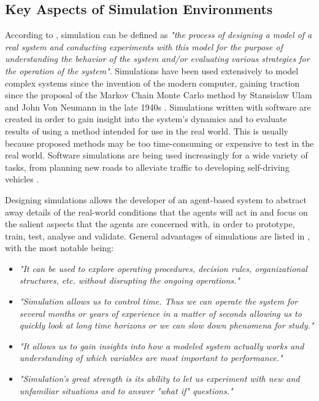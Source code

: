 \subsection{Key Aspects of Simulation Environments}
According to \citeauthor{Shannon1998INTRODUCTIONSIMULATION} \cite{Shannon1998INTRODUCTIONSIMULATION}, simulation can be defined as
\textit{"the process of designing a model of a real system and conducting experiments with this model for the purpose of understanding the behavior of the system and/or evaluating various strategies for the operation of the system"}. 
Simulations have been used extensively to model complex systems since the invention of the modern computer, gaining traction since the proposal of the Markov Chain Monte Carlo method by Stansislaw Ulam and John Von Neumann in the late 1940s \cite{Robert2011AIncomplete}. Simulations written with software are created in order to gain insight into the system's dynamics and to evaluate results of using a method intended for use in the real world. This is usually because proposed methods may be too time-consuming or expensive to test in the real world. Software simulations are being used increasingly for a wide variety of tasks, from planning new roads to alleviate traffic \cite{Pell2017TrendsSimulation} to developing self-driving vehicles \cite{Dosovitskiy2017CARLA:Simulator}. 

Designing simulations allows the developer of an agent-based system to abstract away details of the real-world conditions that the agents will act in and focus on the salient aspects that the agents are concerned with, in order to prototype, train, test, analyse and validate. General advantages of simulations are listed in  \cite{Shannon1998INTRODUCTIONSIMULATION}, with the most notable being:
\begin{itemize}
    \item \textit{"It can be used to explore operating procedures, decision rules, organizational structures, etc. without disrupting the ongoing operations."}
    \item \textit{"Simulation allows us to control time. Thus we can operate the system for several months or years of experience in a matter of seconds allowing us to quickly look at long time horizons or we can slow down phenomena for study."}
    \item \textit{"It allows us to gain insights into how a modeled system actually works and understanding of which variables are most important to performance."}
    \item \textit{"Simulation's great strength is its ability to let us experiment with new and unfamiliar situations and to answer "what if" questions."}
\end{itemize}


